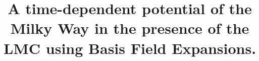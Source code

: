 \documentclass[twocolumn]{aastex62}
\begin{document}
\title{A time-dependent potential of the Milky Way in the presence of the LMC using Basis Field Expansions.}


\end{document}
